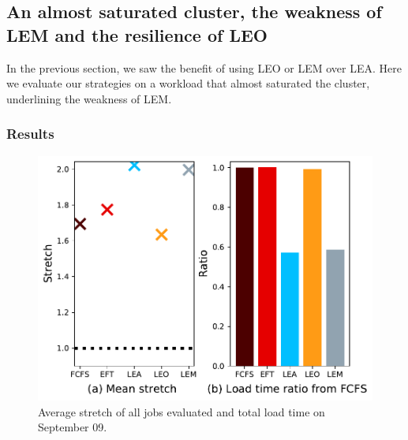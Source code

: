 \documentclass[conference,10pt]{IEEEtran}
\begin{document}
\subsection{An almost saturated cluster, the weakness of LEM and the resilience of LEO}\label{sec.09-09}

In the previous section, we saw the benefit of using LEO or LEM over LEA.
Here we evaluate our strategies on a workload that almost saturated the
cluster, underlining the weakness of LEM.

\subsubsection{Results}

\begin{figure}[t]\centering\includegraphics[width=1\linewidth]{../MBSS/plot/Results_FCFS_Score_Backfill_2022-09-09->2022-09-09_V10000_Mean_Stretch_Total_waiting_for_a_load_time_and_transfer_time_450_128_32_256_4_1024.pdf}\caption{Average stretch of all jobs evaluated and total load time on September 09.}\label{stretch.09-09}\end{figure}
\end{document}
